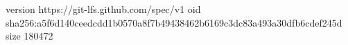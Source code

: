 version https://git-lfs.github.com/spec/v1
oid sha256:a5f6d140ceedcdd1b0570a8f7b49438462b6169c3dc83a493a30dfb6cdef245d
size 180472
